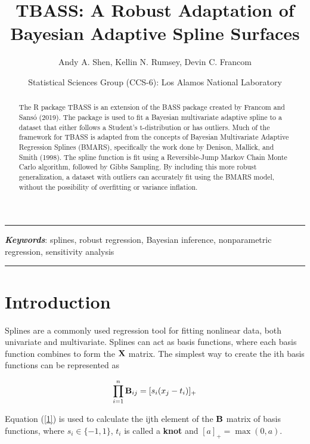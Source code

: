 \documentclass[
]{article}
\title{TBASS: A Robust Adaptation of Bayesian Adaptive Spline Surfaces}
\author{Andy A. Shen, Kellin N. Rumsey, Devin C. Francom}
\date{Statistical Sciences Group (CCS-6): Los Alamos National Laboratory}
\begin{document}
\maketitle

\begin{center}\rule{0.5\linewidth}{0.5pt}\end{center}

\begin{abstract}

The R package TBASS is an extension of the BASS package created by Francom and Sansó (2019). The package is used to fit a Bayesian multivariate adaptive spline to a dataset that either follows a Student's t-distribution or has outliers. Much of the framework for TBASS is adapted from the concepts of Bayesian Multivariate Adaptive Regression Splines (BMARS), specifically the work done by Denison, Mallick, and Smith (1998). The spline function is fit using a Reversible-Jump Markov Chain Monte Carlo algorithm, followed by Gibbs Sampling. By including this more robust generalization, a dataset with outliers can accurately fit using the BMARS model, without the possibility of overfitting or variance inflation.\newline

\end{abstract}

\textbf{\emph{Keywords}}: splines, robust regression, Bayesian
inference, nonparametric regression, sensitivity analysis

\begin{center}\rule{0.5\linewidth}{0.5pt}\end{center}

\hypertarget{introduction}{%
\section{Introduction}\label{introduction}}

Splines are a commonly used regression tool for fitting nonlinear data,
both univariate and multivariate. Splines can act as basis functions,
where each basis function combines to form the \({\bf X}\) matrix. The
simplest way to create the ith basis functions can be represented as

\begin{equation}
\label{1}
\prod_{i=1}^{n}{\bf B}_{ij} = [s_i(x_{j} - t_{i})]_{+}
\end{equation}

Equation (\ref{1}) is used to calculate the ijth element of the
\({\bf B}\) matrix of basis functions, where
\(s_i \in \lbrace-1,1\rbrace\), \(t_i\) is called a \textbf{knot} and
\([a]_{+} = \max(0, a)\).
\end{document}
